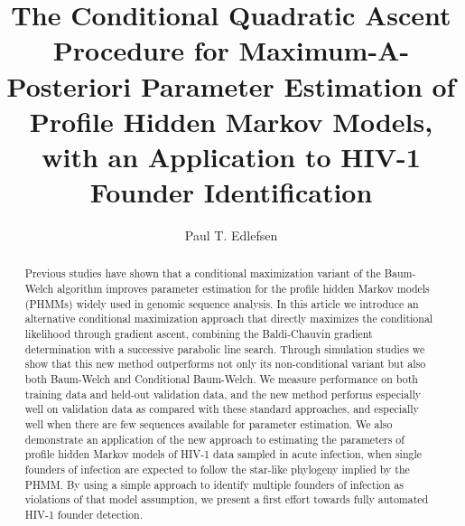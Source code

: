 \documentclass[preprint,12pt,authoryear]{elsarticle}
\begin{document}
\begin{frontmatter}


\title{The Conditional Quadratic Ascent Procedure for Maximum-A-Posteriori Parameter Estimation of Profile Hidden Markov Models, with an Application to HIV-1 Founder Identification}
\author{Paul T. Edlefsen}
\address{Fred Hutchinson Cancer Research Center}





\begin{abstract}
  Previous studies have shown that a conditional maximization variant
  of the Baum-Welch algorithm improves parameter estimation for the
  profile hidden Markov models (PHMMs) widely used in genomic sequence
  analysis.  In this article we introduce an alternative conditional
  maximization approach that directly maximizes the conditional
  likelihood through gradient ascent, combining the Baldi-Chauvin
  gradient determination with a successive parabolic line search.
  Through simulation studies we show that this new method outperforms
  not only its non-conditional variant but also both Baum-Welch and
  Conditional Baum-Welch.  We measure performance on both training
  data and held-out validation data, and the new method performs
  especially well on validation data as compared with these standard
  approaches, and especially well when there are few sequences available for parameter estimation.  We also demonstrate an application of the new approach
  to estimating the parameters of profile hidden Markov models of
  HIV-1 data sampled in acute infection, when single founders of
  infection are expected to follow the star-like phylogeny implied by
  the PHMM. By using a simple approach to identify multiple founders of infection as violations of that model assumption, we present a first effort towards fully automated HIV-1 founder detection.
\end{abstract}


\end{frontmatter}
\end{document}
